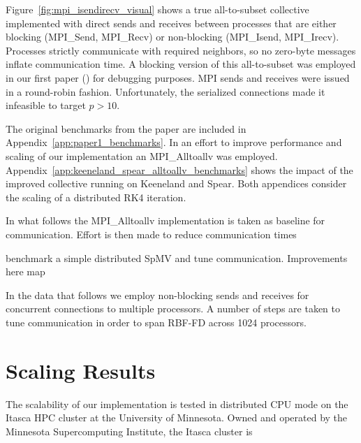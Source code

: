 \documentclass{report}
\begin{document}
Figure~\ref{fig:mpi_isendirecv_visual} shows a true all-to-subset collective implemented with direct sends and receives between processes that are either blocking (MPI\_Send, MPI\_Recv) or non-blocking (MPI\_Isend, MPI\_Irecv). Processes strictly communicate with required neighbors, so no zero-byte messages inflate communication time. 
A blocking version of this all-to-subset was employed in our first paper (\cite{BolligFlyerErlebacher2012}) for debugging purposes. MPI sends and receives were issued in a round-robin fashion. Unfortunately, the serialized connections made it infeasible to target $p > 10$. 

The original benchmarks from the paper are included in Appendix~\ref{app:paper1_benchmarks}. In an effort to improve performance and scaling of our implementation an MPI\_Alltoallv was employed. Appendix~\ref{app:keeneland_spear_alltoallv_benchmarks} shows the impact of the improved collective running on Keeneland and Spear. Both appendices consider the scaling of a distributed RK4 iteration. 

In what follows the MPI\_Alltoallv implementation is taken as baseline for communication. Effort is then made to reduce communication times 

 benchmark a simple distributed SpMV and tune communication. Improvements here map 

In the data that follows we employ non-blocking sends and receives for concurrent connections to multiple processors. A number of steps are taken to tune communication in order to span RBF-FD across 1024 processors.


\section{Scaling Results} 
\label{sec:cpu_scaling}


The scalability of our implementation is tested in distributed CPU mode  on the Itasca HPC cluster at the University of Minnesota. Owned and operated by the Minnesota Supercomputing Institute, the Itasca cluster is 
\end{document}
